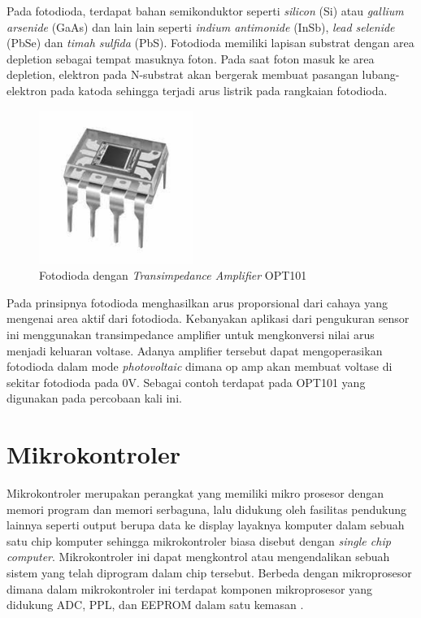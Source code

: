 Pada fotodioda, terdapat bahan semikonduktor seperti \textit{silicon} (Si) atau \textit{gallium
arsenide} (GaAs) dan lain lain seperti \textit{indium antimonide} (InSb), \textit{lead selenide}
(PbSe) dan \textit{timah sulfida} (PbS). Fotodioda memiliki lapisan substrat dengan area depletion
sebagai tempat masuknya foton. Pada saat foton masuk ke area depletion, elektron pada N-substrat
akan bergerak membuat pasangan lubang-elektron pada katoda sehingga terjadi arus listrik pada
rangkaian fotodioda\cite{Vlasov2023}.

\begin{figure}[H]
    \centering
    \includegraphics[width=5cm]{Images/OPT101.jpg}
    \caption{Fotodioda dengan \textit{Transimpedance Amplifier} OPT101}
    \label{fig:opt101}
\end{figure}

Pada prinsipnya fotodioda menghasilkan arus proporsional dari cahaya yang mengenai area aktif dari
fotodioda. Kebanyakan aplikasi dari pengukuran sensor ini menggunakan transimpedance amplifier
untuk mengkonversi nilai arus menjadi keluaran voltase. Adanya amplifier tersebut dapat
mengoperasikan fotodioda dalam mode \textit{photovoltaic} dimana op amp akan membuat voltase di
sekitar fotodioda pada 0V. Sebagai contoh terdapat pada OPT101 yang digunakan pada percobaan kali
ini.




\section{Mikrokontroler}
Mikrokontroler merupakan perangkat yang memiliki mikro prosesor dengan memori program dan memori
serbaguna, lalu didukung oleh fasilitas pendukung lainnya seperti output berupa data ke display
layaknya komputer dalam sebuah satu chip komputer sehingga mikrokontroler biasa disebut dengan
\textit{single chip computer}. Mikrokontroler ini dapat mengkontrol atau mengendalikan sebuah sistem
yang telah diprogram dalam chip tersebut. Berbeda dengan mikroprosesor dimana dalam mikrokontroler
ini terdapat komponen mikroprosesor yang didukung ADC, PPL, dan EEPROM dalam satu kemasan
\cite{Sokop2016}.

